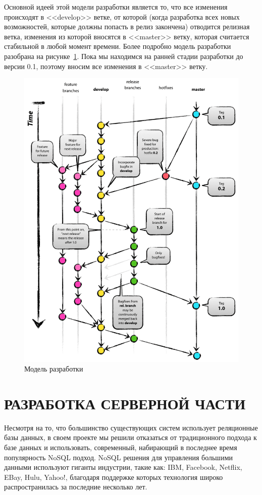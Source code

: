 \documentclass[14pt, a4paper]{extreport}
\begin{document}
Основной идеей этой модели разработки является то, что все изменения происходят в
<<develop>> ветке, от которой (когда разработка всех новых возможностей, которые
должны попасть в релиз закончена) отводится релизная ветка, изменения из которой
вносятся в <<master>> ветку, которая считается стабильной в любой момент времени.
Более подробно модель разработки разобрана на рисунке~\ref{fig:branching}.
Пока мы находимся на ранней стадии разработки до версии 0.1, поэтому вносим все изменения
в <<master>> ветку. %

\begin{figure}[!htb]
  \centering
    \includegraphics[scale=0.3]{pics/branching.png}
    \caption{Модель разработки}
    \label{fig:branching}
\end{figure}

\chapter{\MakeTextUppercase{Разработка серверной части}}
Несмотря на то, что большинство существующих систем использует реляционные
базы данных, в своем проекте мы решили отказаться от традиционного подхода
к базе данных и использовать, современный, набирающий в последнее время популярность
NoSQL подход. NoSQL решения для управления большими данными используют гиганты индустрии,
такие как: IBM, Facebook, Netflix, EBay, Hulu, Yahoo!, благодаря поддержке которых технология
широко распространилась за последние несколько лет.
\end{document}
